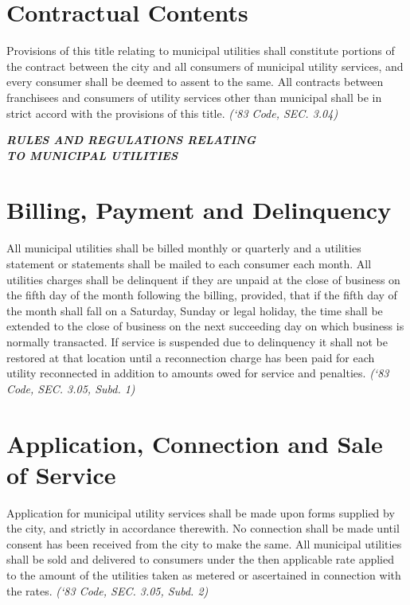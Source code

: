 \section{Contractual Contents}
Provisions of this title relating to municipal utilities shall constitute portions of the contract between the city and all consumers of municipal utility services, and every consumer shall be deemed to assent to the same.  All contracts between franchisees and consumers of utility services other than municipal shall be in strict accord with the provisions of this title.\newline
\emph{(‘83 Code, SEC. 3.04)}\newline

\begin{center}
\textbf{\emph{\LARGE{RULES AND REGULATIONS RELATING\\TO MUNICIPAL UTILITIES}}}
\end{center}
\setcounter{section}{14}
\section{Billing, Payment and Delinquency}
All municipal utilities shall be billed monthly or quarterly and a utilities statement or statements shall be mailed to each consumer each month.  All utilities charges shall be delinquent if they are unpaid at the close of business on the fifth day of the month following the billing, provided, that if the fifth day of the month shall fall on a Saturday, Sunday or legal holiday, the time shall be extended to the close of business on the next succeeding day on which business is normally transacted.  If service is suspended due to delinquency it shall not be restored at that location until a reconnection charge has been paid for each utility reconnected in addition to amounts owed for service and penalties.\newline
\emph{(‘83 Code, SEC. 3.05, Subd. 1)}
\section{Application, Connection and Sale of Service}
Application for municipal utility services shall be made upon forms supplied by the city, and strictly in accordance therewith.  No connection shall be made until consent has been received from the city to make the same.  All municipal utilities shall be sold and delivered to consumers under the then applicable rate applied to the amount of the utilities taken as metered or ascertained in connection with the rates.\newline
\emph{(‘83 Code, SEC. 3.05, Subd. 2)}
